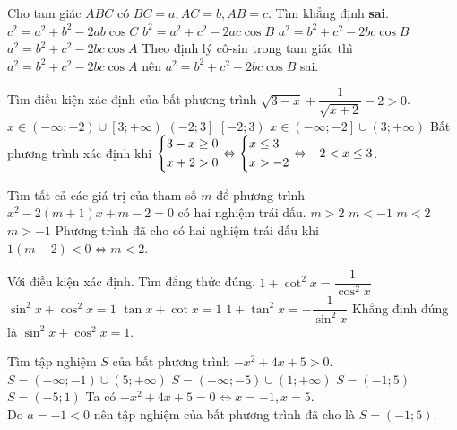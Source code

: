 \begin{ex}%
	Cho tam giác $ABC$ có $BC=a, AC=b, AB=c$. Tìm khẳng định \textbf{sai}.
	\choice
	{$c^2=a^2+b^2-2ab\cos C$}
	{$b^2=a^2+c^2-2ac\cos B$}
	{\True $a^2=b^2+c^2-2bc\cos B$}
	{$a^2=b^2+c^2-2bc\cos A$}
	\loigiai
	{Theo định lý cô-sin trong tam giác thì $a^2=b^2+c^2-2bc\cos A$ nên $a^2=b^2+c^2-2bc\cos B$ sai.}
\end{ex}

\begin{ex}%
	Tìm điều kiện xác định của bất phương trình $\sqrt{3-x}+\dfrac{1}{\sqrt{x+2}}-2>0$.
	\choice
	{$x\in\left(-\infty;-2\right)\cup\left[3;+\infty\right)$}
	{\True $\left(-2;3\right]$}
	{$\left[-2;3\right)$}
	{$x\in\left(-\infty;-2\right]\cup\left(3;+\infty\right)$}
	\loigiai
	{
		Bất phương trình xác định khi $\left\{\begin{aligned}&3-x\geq 0\\&x+2>0\end{aligned}\right.\Leftrightarrow\left\{\begin{aligned}&x\leq 3\\&x>-2\end{aligned}\right.\Leftrightarrow -2<x\leq 3$.}
\end{ex}

\begin{ex}%
	Tìm tất cả các giá trị của tham số $m$ để phương trình $x^2-2(m+1)x+m-2=0$ có hai nghiệm trái dấu.
	\choice
	{$m>2$}
	{$m<-1$}
	{\True $m<2$}
	{$m>-1$}
	\loigiai
	{Phương trình đã cho có hai nghiệm trái dấu khi $1(m-2)<0\Leftrightarrow m<2$.}
\end{ex}

\begin{ex}%
	Với điều kiện xác định. Tìm đẳng thức đúng.
	\choice
	{$1+\cot^2x=\dfrac{1}{\cos^2x}$}
	{\True $\sin^2x+\cos^2x=1$}
	{$\tan x+\cot x=1$}
	{$1+\tan^2x=-\dfrac{1}{\sin^2x}$}
	\loigiai
	{Khẳng định đúng là $\sin^2x+\cos^2x=1$.}
\end{ex}

\begin{ex}%
	Tìm tập nghiệm $S$ của bất phương trình $-x^2+4x+5>0$.
	\choice
	{$S=\left(-\infty;-1\right)\cup\left(5;+\infty\right)$}
	{$S=\left(-\infty;-5\right)\cup\left(1;+\infty\right)$}
	{\True $S=\left(-1;5\right)$}
	{$S=\left(-5;1\right)$}
	\loigiai
	{Ta có $-x^2+4x+5=0\Leftrightarrow x=-1, x=5$.\\Do $a=-1<0$ nên tập nghiệm của bất phương trình đã cho là $S=\left(-1;5\right)$.}
\end{ex}

